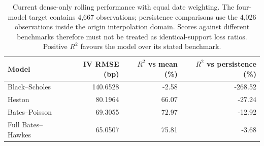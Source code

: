 \begin{table}[H]
\centering\small
\begin{tabular}{lrrr}
\toprule
Model & IV RMSE (bp) & $R^2$ vs mean (\%) & $R^2$ vs persistence (\%) \\
\midrule
Black--Scholes & 140.6528 & -2.58 & -268.52 \\
Heston & 80.1964 & 66.07 & -27.24 \\
Bates--Poisson & 69.3055 & 72.97 & -12.92 \\
Full Bates--Hawkes & 65.0507 & 75.81 & -3.68 \\
\bottomrule
\end{tabular}
\caption{Current dense-only rolling performance with equal date weighting.
The four-model target contains 4,667 observations; persistence comparisons
use the 4,026 observations inside the origin interpolation domain. Scores
against different benchmarks therefore must not be treated as identical-support
loss ratios. Positive $R^2$ favours the model over its stated benchmark.}
\label{tab:current-dense-oos}
\end{table}
